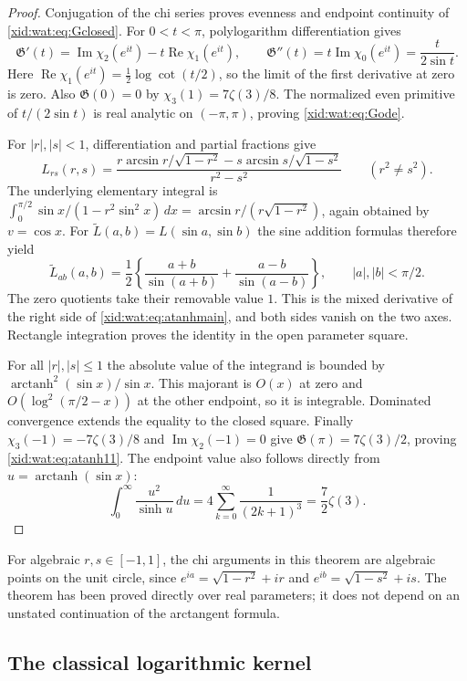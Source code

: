 \documentclass[11pt,a4paper]{article}
\numberwithin{equation}{section}
\theoremstyle{definition}
\theoremstyle{remark}
\begin{document}
\begin{proof}
Conjugation of the chi series proves evenness and endpoint
continuity of \eqref{xid:wat:eq:Gclosed}. For $0<t<\pi$,
polylogarithm differentiation gives
\[
 \mathfrak G'(t)=\operatorname{Im}\chi_2(e^{it})
                    -t\operatorname{Re}\chi_1(e^{it}),
 \qquad
 \mathfrak G''(t)=t\operatorname{Im}\chi_0(e^{it})
                 =\frac{t}{2\sin t}.
\]
Here $\operatorname{Re}\chi_1(e^{it})=\tfrac12\log\cot(t/2)$,
so the limit of the first derivative at zero is zero. Also
$\mathfrak G(0)=0$ by $\chi_3(1)=7\zeta(3)/8$.
The normalized even primitive of $t/(2\sin t)$ is real analytic
on $(-\pi,\pi)$, proving \eqref{xid:wat:eq:Gode}.

For $|r|,|s|<1$, differentiation and partial fractions give
\[
 L_{rs}(r,s)=
 \frac{r\arcsin r/\sqrt{1-r^2}
       -s\arcsin s/\sqrt{1-s^2}}{r^2-s^2}
 \qquad(r^2\ne s^2).
\]
The underlying elementary integral is
$\int_0^{\pi/2}\sin x/(1-r^2\sin^2x)\,dx
 =\arcsin r/(r\sqrt{1-r^2})$, again obtained by $v=\cos x$.
For $\widetilde L(a,b)=L(\sin a,\sin b)$ the sine addition formulas
therefore yield
\[
 \widetilde L_{ab}(a,b)
   =\frac12\left\{
       \frac{a+b}{\sin(a+b)}+\frac{a-b}{\sin(a-b)}\right\},
 \qquad |a|,|b|<\pi/2.
\]
The zero quotients take their removable value $1$. This is the
mixed derivative of the right side of \eqref{xid:wat:eq:atanhmain},
and both sides vanish on the two axes. Rectangle integration proves
the identity in the open parameter square.

For all $|r|,|s|\leq1$ the absolute value of the integrand is bounded
by $\operatorname{arctanh}^2(\sin x)/\sin x$. This majorant is
$O(x)$ at zero and $O(\log^2(\pi/2-x))$ at the other endpoint,
so it is integrable. Dominated convergence extends the equality
to the closed square. Finally
$\chi_3(-1)=-7\zeta(3)/8$ and
$\operatorname{Im}\chi_2(-1)=0$ give
$\mathfrak G(\pi)=7\zeta(3)/2$, proving
\eqref{xid:wat:eq:atanh11}.
The endpoint value also follows directly from
$u=\operatorname{arctanh}(\sin x)$:
\[
 \int_0^\infty\frac{u^2}{\sinh u}\,du
    =4\sum_{k=0}^\infty\frac1{(2k+1)^3}
    =\frac72\zeta(3).
\]
\end{proof}

For algebraic $r,s\in[-1,1]$, the chi arguments in this theorem are
algebraic points on the unit circle, since
$e^{ia}=\sqrt{1-r^2}+ir$ and
$e^{ib}=\sqrt{1-s^2}+is$. The theorem has been proved directly over
real parameters; it does not depend on an unstated continuation of
the arctangent formula.

\subsection{The classical logarithmic kernel}
\end{document}
